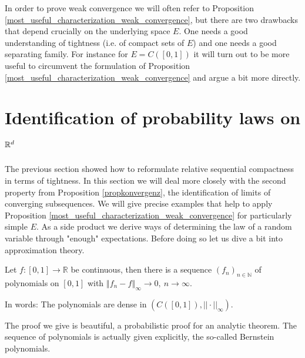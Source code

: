 In order to prove weak convergence we will often refer to Proposition \ref{most_useful_characterization_weak_convergence}, but there are two drawbacks that depend crucially on the underlying space $E$. One needs a good understanding of tightness (i.e. of compact sets of $E$) and one needs a good separating family. For instance for $E=C([0,1])$ it will turn out to be more useful to circumvent the formulation of Proposition \ref{most_useful_characterization_weak_convergence} and argue a bit more directly.

	\marginpar{\textcolor{red}{Lecture 14}}
\section[Identification of probability laws on $\R$]{Identification of probability laws on $\mathbb{R}^d$}\label{sec:unique}
The previous section showed how to reformulate relative sequential compactness in terms of tightness. In this section we will deal more closely with the second property from Proposition \ref{propkonvergenz}, the identification of limits of converging subsequences. We will give precise examples that help to apply Proposition \ref{most_useful_characterization_weak_convergence} for particularly simple $E$. As a side product we derive ways of determining the law of a random variable through "{}enough"{} expectations. Before doing so let us dive a bit into approximation theory.
\begin{lsatzwichtig}
\begin{theorem}\label{Weierstrass_approx}
	Let $f \colon [0,1] \to \mathbb{R}$ be continuous, then there is a sequence $(f_n)_{n\in\mathbb{N}}$ of polynomials on $[0,1]$ with $\left\Vert f_n - f \right\Vert_{\infty} \to 0, \: n \to \infty$.\smallskip
	
	In words: The polynomials are dense in $( C([0,1]),||\cdot||_\infty)$.
\end{theorem}
\end{lsatzwichtig}
The proof we give is beautiful, a probabilistic proof for an analytic theorem. The sequence of polynomials is actually given explicitly, the so-called Bernstein polynomials.
